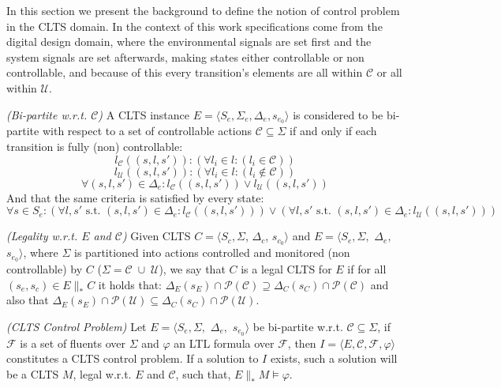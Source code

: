 In this section we present the background to define the notion of control problem in the CLTS domain.  In the context of this work specifications come from the digital design domain, where the environmental signals are set first and the system signals are set afterwards, making states either controllable or non controllable, and because of this every transition's elements are all within $\mathcal{C}$ or all within $\mathcal{U}$. 

\begin{definition}\label{def:bi-partite_clts} \emph{(Bi-partite w.r.t. $\mathcal{C}$)} 
A CLTS instance $E=\langle S_e, \Sigma_e, \Delta_e, s_{e_0} \rangle$ is considered to be bi-partite with respect to a set of controllable actions $\mathcal{C} \subseteq \Sigma$ if and only if each transition is fully (non) controllable:
\[ l_{\mathcal{C}}((s,l,s')): ( \forall l_i \in l:(l_i \in \mathcal{C}))\]
\[ l_{\mathcal{U}}((s,l,s')): ( \forall l_i \in l:(l_i \not\in \mathcal{C}))\]
\[ \forall (s,l,s') \in \Delta_e: l_{\mathcal{C}}((s,l,s')) \vee l_{\mathcal{U}}((s,l,s')) \]
And that the same criteria is satisfied by every state:
\[ \forall s \in S_e : (\forall l, s' \text{ s.t. } (s,l,s') \in \Delta_e:l_{\mathcal{C}}((s,l,s')))\vee (\forall l, s' \text{ s.t. } (s,l,s') \in \Delta_e:l_{\mathcal{U}}((s,l,s')))\]
\end{definition}

\begin{definition}
	\label{def:legal_clts} \emph{(Legality w.r.t. $E$ and $\mathcal{C}$)} 
	Given CLTS $C = \langle S_c, \Sigma$, $\Delta_c$, $s_{c_0}\rangle$ and $E = \langle S_e,\Sigma,$ $\Delta_e,$ $s_{e_0}\rangle$, where $\Sigma$ is partitioned into actions controlled and monitored (non controllable) by $C$ ($\Sigma=\mathcal{C} \; \cup \;\mathcal{U}$), we say that $C$ is a legal CLTS for $E$ if for all $(s_e,s_c) \in E \parallel_* C$ it holds that:
	$\Delta_{E}(s_E)\cap \mathcal{P}(\mathcal{C}) \supseteq \Delta_{C}(s_C)\cap \mathcal{P}(\mathcal{C})$ and also that  $\Delta_{E}(s_E)\cap \mathcal{P}(\mathcal{U}) \subseteq \Delta_{C}(s_C)\cap \mathcal{P}(\mathcal{U})$.
\end{definition}

\begin{definition}
	\label{def:clts_control_problem} \emph{(CLTS Control Problem)} 
	Let $E = \langle S_e,\Sigma,$ $\Delta_e,$ $s_{e_0}\rangle $ be bi-partite w.r.t. $\mathcal{C} \subseteq \Sigma$, if $\mathcal{F}$ is a set of fluents over $\Sigma$ and $\varphi$ an LTL formula over $\mathcal{F}$, then $I = \langle E, \mathcal{C}, \mathcal{F}, \varphi \rangle$ constitutes a CLTS control problem. If a solution to $I$ exists, such a solution will be a CLTS $M$, legal w.r.t. $E$ and $\mathcal{C}$, such that, $E \parallel_* M \models \varphi$.
\end{definition}
